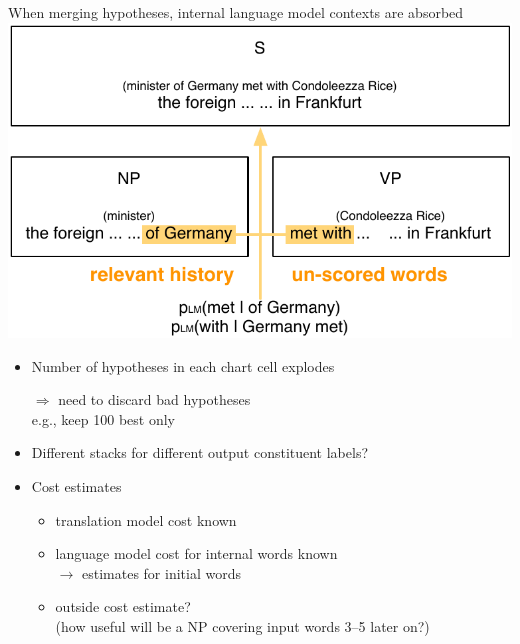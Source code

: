 \documentclass[landscape]{slides}
\begin{document}
\begin{center} \vspace{15mm}
When merging hypotheses, internal language model contexts are absorbed\\[15mm]
\includegraphics[scale=1.1]{syntax-rule-lm-merging.pdf}
\end{center} 


\begin{itemize}
\item Number of hypotheses in each chart cell explodes
\item[$\Rightarrow$] need to discard bad hypotheses\\ e.g., keep 100 best only
\item Different stacks for different output constituent labels?
\item Cost estimates
\begin{itemize}
\item translation model cost known
\item language model cost for internal words known\\
$\rightarrow$ estimates for initial words
\item outside cost estimate?\\
(how useful will be a NP covering input words 3--5 later on?)
\end{itemize}
\end{itemize}

\end{document}
